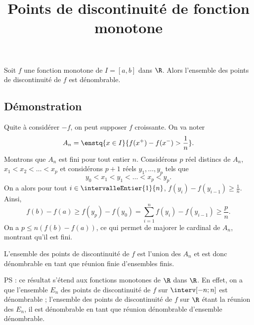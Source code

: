 \documentclass[fontsize=12pt,twoside=false,parskip=half]{scrartcl}
\title{Points de discontinuité de fonction monotone}
\date{}
\author{}
\begin{document}
\maketitle
   \begin{Theoreme}
      Soit $f$ une fonction monotone de $I = [a, b]$ dans $\R$. Alors l’ensemble des points de discontinuité de $f$ est 
      dénombrable.
   \end{Theoreme}
   \subsection{Démonstration}
      Quite à considérer $-f$, on peut supposer $f$ croissante.
      On va noter
      \[
         A_n = \enstq{x \in I}{f(x^+) - f(x^-) > \frac{1}{n}}.
      \]
      Montrons que $A_n$ est fini pour tout entier $n$. Considérons $p$ réel distincs de $A_n$, $x_1 < x_2 < \ldots < x_p$ 
      et considérons $p + 1$ réels $y_1, \ldots, y_p$ tels que
      \[
         y_0 < x_1 < y_1 < \ldots < x_p < y_p.
      \]
      On a alors pour tout $i \in \intervalleEntier{1}{n}$, $f(y_i) - f(y_{i- 1}) \geq \frac{1}{n}$. Ainsi,
      \[
         f(b) - f(a) \geq f(y_p) - f(y_0) = \sum_{i = 1}^n f(y_i) - f(y_{i - 1}) \geq \frac{p}{n}.
      \]
      On a $p \leq n(f(b) - f(a))$, ce qui permet de majorer le cardinal de $A_n$, montrant qu’il est fini.
      
      L’ensemble des points de discontinuité de $f$ est l’union des $A_n$ et est donc dénombrable en tant que réunion
      finie d’ensembles finis.
      
      PS : ce résultat s’étend aux fonctions monotones de $\R$ dans $\R$. En effet, on a que l’ensemble $E_n$
           des points de discontinuité de $f$ sur $\interv[-n; n]$ est dénombrable ; l’ensemble des points de discontinuité
           de $f$ sur $\R$ étant la réunion des $E_n$, il est dénombrable en tant que réunion dénombrable d’ensemble dénombrable.
\end{document}
